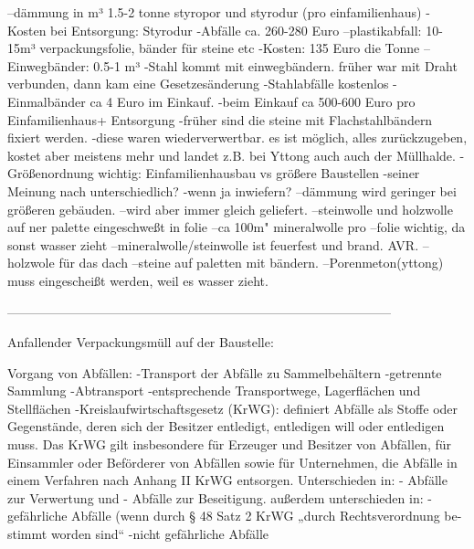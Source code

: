             --dämmung in m³   1.5-2 tonne styropor und styrodur (pro einfamilienhaus)
                -Kosten bei Entsorgung: Styrodur -Abfälle ca. 260-280 Euro
            --plastikabfall: 10-15m³ verpackungsfolie, bänder für steine etc
                -Kosten: 135 Euro die Tonne
            --Einwegbänder: 0.5-1 m³
                -Stahl kommt mit einwegbändern. früher war mit Draht verbunden, dann kam eine Gesetzesänderung
                    -Stahlabfälle kostenlos
                -Einmalbänder ca 4 Euro im Einkauf. 
                -beim Einkauf ca 500-600 Euro pro Einfamilienhaus+ Entsorgung 
                -früher sind die steine mit Flachstahlbändern fixiert werden. 
                    -diese waren wiederverwertbar. es ist möglich, alles zurückzugeben, kostet aber meistens mehr und landet z.B. bei Yttong auch auch der Müllhalde.
        -Größenordnung wichtig: Einfamilienhausbau vs größere Baustellen
            -seiner Meinung nach unterschiedlich? 
                    -wenn ja inwiefern?
                        --dämmung wird geringer bei größeren gebäuden. 
                        --wird aber immer gleich geliefert.
                        --steinwolle und holzwolle auf ner palette eingeschweßt in folie
                        --ca 100m" mineralwolle pro
                        --folie wichtig, da sonst wasser zieht
                        --mineralwolle/steinwolle ist feuerfest und brand. AVR.
                        --holzwole für das dach
                        --steine auf paletten mit bändern.
                        --Porenmeton(yttong) muss eingescheißt werden, weil es wasser zieht. 





------------------------------------------------------------------------------------------

Anfallender Verpackungsmüll auf der Baustelle:

Vorgang von Abfällen:   -Transport der Abfälle zu Sammelbehältern
                        -getrennte Sammlung
                        -Abtransport
                        -entsprechende Transportwege, Lagerflächen und Stellflächen
    -Kreislaufwirtschaftsgesetz (KrWG): 
        definiert Abfälle als Stoffe oder Gegenstände, deren sich der Besitzer
        entledigt, entledigen will oder entledigen muss. Das KrWG gilt insbesondere für Erzeuger und Besitzer von Abfällen, für Einsammler oder Beförderer von Abfällen sowie für Unternehmen, die Abfälle in einem Verfahren nach Anhang II KrWG entsorgen.
    Unterschieden in:
    - Abfälle zur Verwertung und
    - Abfälle zur Beseitigung.
    außerdem unterschieden in:
    -gefährliche Abfälle (wenn durch § 48 Satz 2 KrWG „durch Rechtsverordnung be-
        stimmt worden sind“
    -nicht gefährliche Abfälle
    

